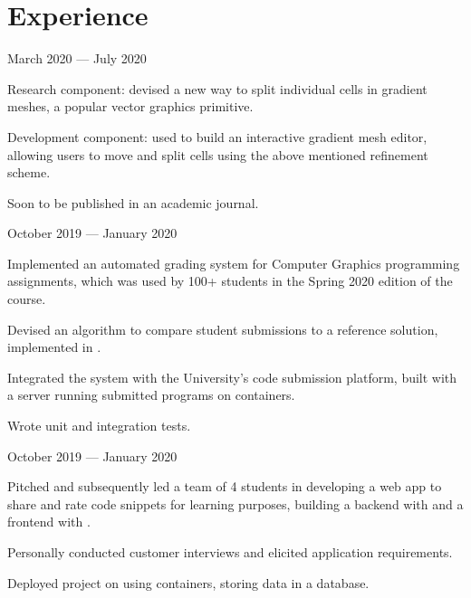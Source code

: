\section*{Experience}

\begin{cventries}
{March 2020 --- July 2020}
{%
  \begin{cvitems}
		\item Research component: devised a new way to split individual cells in gradient meshes, a popular vector graphics primitive.
		\item Development component: used  to build an interactive gradient mesh editor, allowing users to move and split cells using the above mentioned refinement scheme.
		\item Soon to be published in an academic journal.
	\end{cvitems}
}
{October 2019 --- January 2020} %
{
	\begin{cvitems}
		\item Implemented an automated grading system for Computer Graphics programming assignments, which was used by 100+ students in the Spring 2020 edition of the course.
		\item Devised an algorithm to compare student submissions to a reference solution, implemented in .
		\item Integrated the system with the University's code submission platform, built with a  server running submitted programs on  containers.
		\item Wrote unit and integration tests.
	\end{cvitems}
}
{October 2019 --- January 2020} %
{%
	\begin{cvitems}
	\item Pitched and subsequently led a team of 4 students in developing a web app to share and rate code snippets for learning purposes, building a  backend with  and a  frontend with \cvlanguage{Vue}.
	\item Personally conducted customer interviews and elicited application requirements.
	\item Deployed project on  using  containers, storing data in a  database.

\end{cvitems}}
\end{cventries}
